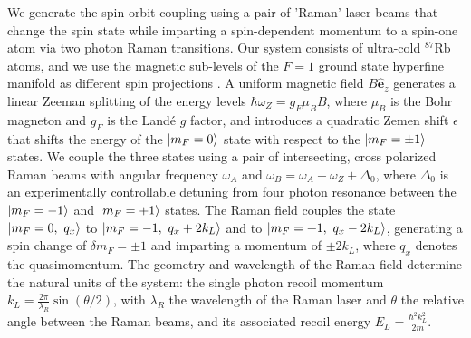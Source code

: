 We generate the spin-orbit coupling using a pair of 'Raman' laser beams that change the spin state while imparting a spin-dependent  momentum to a spin-one atom via two photon Raman transitions. Our system consists of ultra-cold $^{87}\mathrm{Rb}$ atoms, and we use the magnetic sub-levels of the $F=1$ ground state hyperfine manifold  as different spin projections \cite{lan_raman-dressed_2014,campbell_itinerant_2015}.  A uniform magnetic field $B\mathbf{\hat{e}}_z$ generates a linear Zeeman splitting of the energy levels $\hbar\omega_Z=g_F\mu_BB$, where $\mu_B$ is the Bohr magneton and $g_F$ is the Land\'e $g$ factor, and introduces a quadratic Zemen shift $\epsilon$ that shifts the energy of the $|m_F=0\rangle$ state with respect to the $|m_F=\pm1\rangle$ states. We couple the three states using a pair of intersecting, cross polarized Raman beams with angular frequency $\omega_A$ and $\omega_B=\omega_A+\omega_Z+\Delta_0$, where $\Delta_0$ is an experimentally controllable detuning from four photon resonance between the $|m_F=-1\rangle$ and $|m_F=+1\rangle$ states. The Raman field couples the state $|m_F=0,\ q_x\rangle$ to $|m_F=-1,\ q_x+2k_L\rangle$ and to $|m_F=+1,\ q_x-2k_L\rangle$, generating a spin change of $\delta m_F=\pm1$ and imparting a momentum of $\pm 2k_L$, where $q_x$ denotes the quasimomentum. The geometry and wavelength of the Raman field determine the natural units of the system: the single photon recoil momentum $k_L=\frac{2\pi}{\lambda_R}\sin(\theta/2)$, with $\lambda_R$ the wavelength of the Raman laser and $\theta$ the relative angle between the Raman beams, and its associated recoil energy $E_L=\frac{\hbar^2k_L^2}{2m}$.


